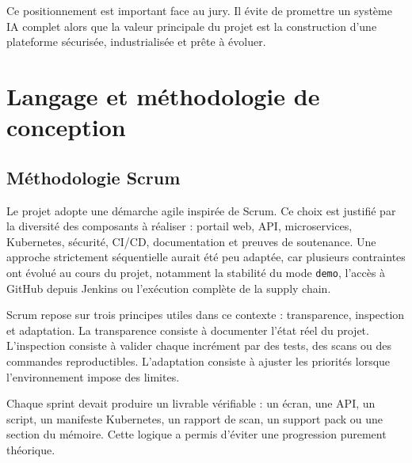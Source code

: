 Ce positionnement est important face au jury. Il évite de promettre un système IA complet alors que la valeur principale du projet est la construction d'une plateforme sécurisée, industrialisée et prête à évoluer.

\section{Langage et méthodologie de conception}

\subsection{Méthodologie Scrum}

Le projet adopte une démarche agile inspirée de Scrum. Ce choix est justifié par la diversité des composants à réaliser : portail web, API, microservices, Kubernetes, sécurité, CI/CD, documentation et preuves de soutenance. Une approche strictement séquentielle aurait été peu adaptée, car plusieurs contraintes ont évolué au cours du projet, notamment la stabilité du mode \texttt{demo}, l'accès à GitHub depuis Jenkins ou l'exécution complète de la supply chain.

Scrum repose sur trois principes utiles dans ce contexte : transparence, inspection et adaptation. La transparence consiste à documenter l'état réel du projet. L'inspection consiste à valider chaque incrément par des tests, des scans ou des commandes reproductibles. L'adaptation consiste à ajuster les priorités lorsque l'environnement impose des limites.

Chaque sprint devait produire un livrable vérifiable : un écran, une API, un script, un manifeste Kubernetes, un rapport de scan, un support pack ou une section du mémoire. Cette logique a permis d'éviter une progression purement théorique.

